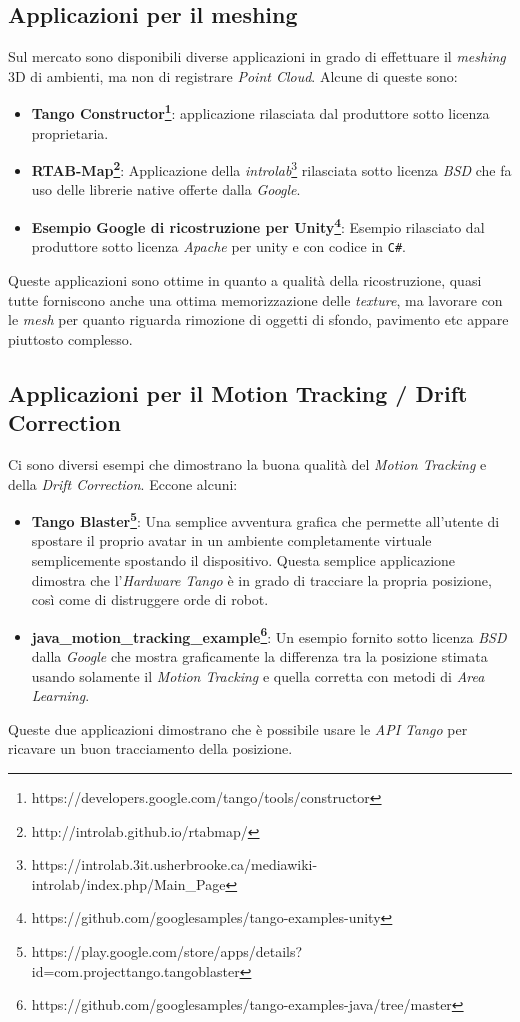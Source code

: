 \subsection{Applicazioni per il meshing}
Sul mercato sono disponibili diverse applicazioni in grado di effettuare il \emph{meshing} 3D di ambienti, ma non di registrare \emph{Point Cloud}. Alcune di queste sono:
\begin{itemize}
	\item \textbf{Tango Constructor\footnote{https://developers.google.com/tango/tools/constructor}}: applicazione rilasciata dal produttore sotto licenza proprietaria.
	\item \textbf{RTAB-Map\footnote{http://introlab.github.io/rtabmap/}}: Applicazione della \emph{introlab}\footnote{https://introlab.3it.usherbrooke.ca/mediawiki-introlab/index.php/Main\_Page} rilasciata sotto licenza \emph{BSD} che fa uso delle librerie native offerte dalla \emph{Google}.
	\item \textbf{Esempio Google di ricostruzione per Unity\footnote{https://github.com/googlesamples/tango-examples-unity}}: Esempio rilasciato dal produttore sotto licenza \emph{Apache} per unity e con codice in \texttt{C\#}.
\end{itemize}
Queste applicazioni sono ottime in quanto a qualità della ricostruzione, quasi tutte forniscono anche una ottima memorizzazione delle \emph{texture}, ma lavorare con le \emph{mesh} per quanto riguarda rimozione di oggetti di sfondo, pavimento etc appare piuttosto complesso.

\subsection{Applicazioni per il Motion Tracking / Drift Correction}
Ci sono diversi esempi che dimostrano la buona qualità del \emph{Motion Tracking} e della \emph{Drift Correction}.
Eccone alcuni:
\begin{itemize}
	\item \textbf{Tango Blaster\footnote{https://play.google.com/store/apps/details?id=com.projecttango.tangoblaster}}: Una semplice avventura grafica che permette all'utente di spostare il proprio avatar in un ambiente completamente virtuale semplicemente spostando il dispositivo. Questa semplice applicazione dimostra che l'\emph{Hardware} \emph{Tango} è in grado di tracciare la propria posizione, così come di distruggere orde di robot.
	\item \textbf{java\_motion\_tracking\_example\footnote{https://github.com/googlesamples/tango-examples-java/tree/master}}: Un esempio fornito sotto licenza \emph{BSD} dalla \emph{Google} che mostra graficamente la differenza tra la posizione stimata usando solamente il \emph{Motion Tracking} e quella corretta con metodi di \emph{Area Learning}.
\end{itemize}
Queste due applicazioni dimostrano che è possibile usare le \emph{API Tango} per ricavare un buon tracciamento della posizione.

